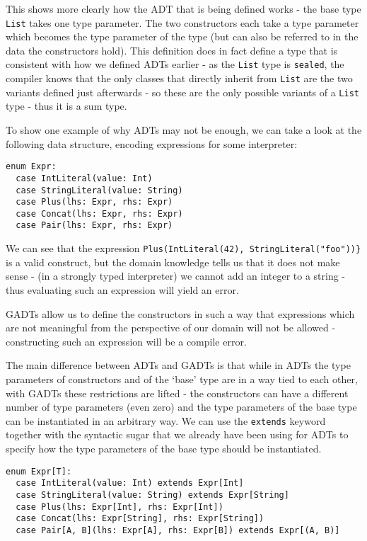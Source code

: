 This shows more clearly how the ADT that is being defined works - the base type \texttt{List} takes one type parameter. The two constructors each take a type parameter which becomes the type parameter of the type (but can also be referred to in the data the constructors hold). This definition does in fact define a type that is consistent with how we defined ADTs earlier - as the \texttt{List} type is \texttt{sealed}, the compiler knows that the only classes that directly inherit from \texttt{List} are the two variants defined just afterwards - so these are the only possible variants of a \texttt{List} type - thus it is a sum type.

To show one example of why ADTs may not be enough, we can take a look at the following data structure, encoding expressions for some interpreter:

\begin{lstlisting}[style=scala]
enum Expr:
  case IntLiteral(value: Int)
  case StringLiteral(value: String)
  case Plus(lhs: Expr, rhs: Expr)
  case Concat(lhs: Expr, rhs: Expr)
  case Pair(lhs: Expr, rhs: Expr)
\end{lstlisting}

We can see that the expression \lstinline[style=scala]|Plus(IntLiteral(42), StringLiteral("foo"))}| is a valid construct, but the domain knowledge tells us that it does not make sense - (in a strongly typed interpreter) we cannot add an integer to a string - thus evaluating such an expression will yield an error.

GADTs allow us to define the constructors in such a way that expressions which are not meaningful from the perspective of our domain will not be allowed - constructing such an expression will be a compile error.

The main difference between ADTs and GADTs is that while in ADTs the type parameters of constructors and of the `base' type are in a way tied to each other, with GADTs these restrictions are lifted - the constructors can have a different number of type parameters (even zero) and the type parameters of the base type can be instantiated in an arbitrary way. We can use the \texttt{extends} keyword together with the syntactic sugar that we already have been using for ADTs to specify how the type parameters of the base type should be instantiated.

\begin{lstlisting}[style=scala]
enum Expr[T]:
  case IntLiteral(value: Int) extends Expr[Int]
  case StringLiteral(value: String) extends Expr[String]
  case Plus(lhs: Expr[Int], rhs: Expr[Int])
  case Concat(lhs: Expr[String], rhs: Expr[String])
  case Pair[A, B](lhs: Expr[A], rhs: Expr[B]) extends Expr[(A, B)]
\end{lstlisting}

